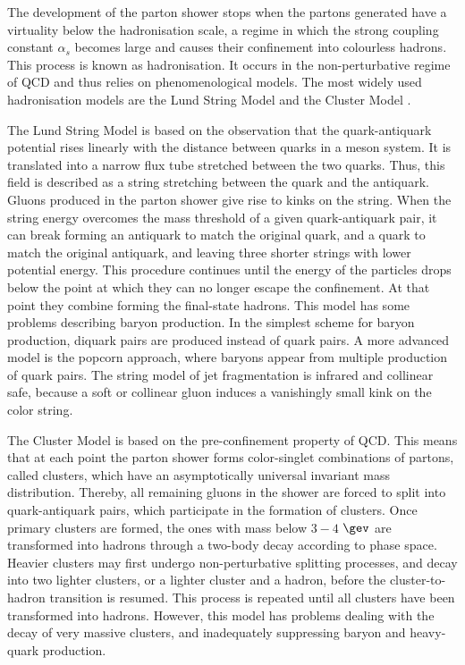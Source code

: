 The development of the parton shower stops when the partons generated have a virtuality below the hadronisation scale, a regime in which  the strong coupling constant $\alpha_{s}$ becomes large and causes their confinement into colourless hadrons. This process is known as hadronisation. It occurs in the non-perturbative regime of QCD and thus relies on phenomenological models. The most widely used hadronisation models are the Lund String Model \cite{Andersson:1983ia,Sjostrand:1984ic} and the Cluster Model \cite{Webber:1983if,Marchesini:1987cf}.\par
The Lund String Model is based on the observation that the quark-antiquark  potential  rises  linearly  with  the  distance  between  quarks  in  a  meson  system. It is translated into a narrow flux tube stretched between the two quarks. Thus, this field is described as a string stretching between the quark and
the antiquark. Gluons produced in the parton shower give rise to kinks on the string. When the string energy overcomes the mass threshold of a given quark-antiquark pair, it can break forming an antiquark to match the original quark, and a quark to match the original antiquark, and leaving three shorter strings with lower potential energy. This procedure continues until the energy of the particles drops below the point at which they can no longer escape the confinement. At that point they combine forming the final-state hadrons. This model has some problems describing baryon production. In the simplest scheme for baryon production, diquark pairs are produced instead of quark pairs.  A more advanced model is the popcorn approach, where baryons appear from multiple production of quark pairs. The string model of jet fragmentation is infrared and collinear safe, because a soft or collinear gluon induces a vanishingly small kink on the color string.\par
The Cluster Model is based on the pre-confinement property of QCD. This means that at each point the parton shower forms color-singlet combinations of partons, called clusters, which have an asymptotically universal invariant mass distribution.
Thereby, all remaining gluons in the shower are forced to split into quark-antiquark pairs, which participate in the formation of clusters.
Once  primary  clusters  are  formed,  the  ones  with  mass  below  $3-4$  $\gev$  are  transformed  into  hadrons through a two-body decay according to phase space.  Heavier clusters may  first undergo non-perturbative splitting  processes,  and  decay  into  two  lighter  clusters,  or  a  lighter  cluster  and  a  hadron,  before the cluster-to-hadron transition is resumed.  This process is repeated until all clusters have been transformed into hadrons. However, this model has problems dealing with the decay of very massive clusters, and inadequately suppressing baryon and heavy-quark production.

